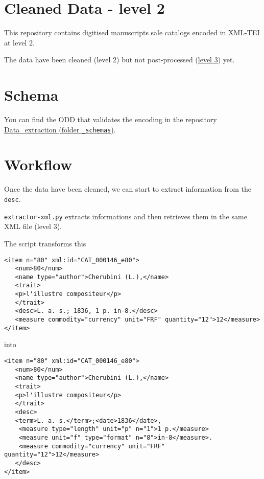 \section*{Cleaned Data - level 2}

This repository contains digitised manuscripts sale catalogs encoded in XML-TEI at level 2.

The data have been cleaned (level 2) but not post-processed (\href{https://github.com/katabase/3\_TaggedData}{level 3}) yet.
\section*{Schema}

You can find the ODD that validates the encoding in the repository \href{https://github.com/katabase/Data\_extraction/tree/master/\_schemas}{Data\_extraction (folder \texttt{\_schemas})}.
\section*{Workflow}

Once the data have been cleaned, we can start to extract information from the \texttt{desc}.

\texttt{extractor-xml.py} extracts informations and then retrieves them in the same XML file (level 3). 

The script transforms this

\begin{listing}[h!]
   \begin{verbatim}
<item n="80" xml:id="CAT_000146_e80">
   <num>80</num>
   <name type="author">Cherubini (L.),</name>
   <trait>
   <p>l'illustre compositeur</p>
   </trait>
   <desc>L. a. s.; 1836, 1 p. in-8.</desc>
   <measure commodity="currency" unit="FRF" quantity="12">12</measure>
</item>

   \end{verbatim}
\end{listing}

\pagebreak
into

\begin{listing}[h!]
   \begin{verbatim}
<item n="80" xml:id="CAT_000146_e80">
   <num>80</num>
   <name type="author">Cherubini (L.),</name>
   <trait>
   <p>l'illustre compositeur</p>
   </trait>
   <desc>
   <term>L. a. s.</term>;<date>1836</date>,
   	<measure type="length" unit="p" n="1">1 p.</measure> 
   	<measure unit="f" type="format" n="8">in-8</measure>.
   	<measure commodity="currency" unit="FRF" quantity="12">12</measure>
   </desc>
</item>

   \end{verbatim}
\end{listing}

